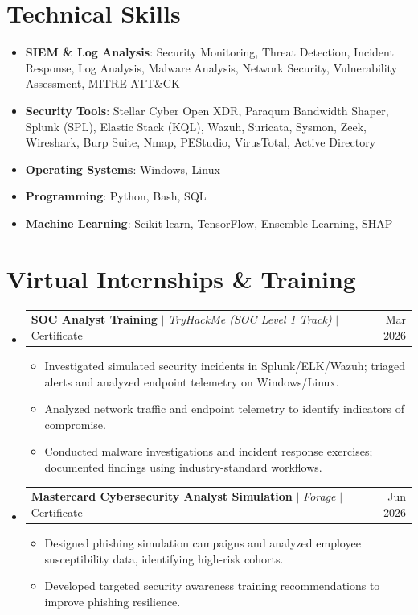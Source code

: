 \documentclass[letterpaper,11pt]{article}
\makeatletter
\newcommand{\resumeItem}[1]{
  \item\small{#1}
}
\newcommand{\resumeProjectHeading}[2]{
    \item
    \begin{tabular*}{0.97\textwidth}{l@{\extracolsep{\fill}}r}
      \small#1 & #2 \\
    \end{tabular*}\vspace{-7pt}
}
\newcommand{\resumeSubHeadingListStart}{\begin{itemize}[leftmargin=0.15in, label={}]}
\newcommand{\resumeSubHeadingListEnd}{\end{itemize}}
\newcommand{\resumeItemListStart}{\begin{itemize}}
\newcommand{\resumeItemListEnd}{\end{itemize}\vspace{-5pt}}
\makeatother
\begin{document}
\section{Technical Skills}
\begin{itemize}[leftmargin=0.15in, label={}]
\small
\item{\textbf{SIEM \& Log Analysis}: Security Monitoring, Threat Detection, Incident Response, Log Analysis, Malware Analysis, Network Security, Vulnerability Assessment, MITRE ATT\&CK}
\item{\textbf{Security Tools}: Stellar Cyber Open XDR, Paraqum Bandwidth Shaper, Splunk (SPL), Elastic Stack (KQL), Wazuh, Suricata, Sysmon, Zeek, Wireshark, Burp Suite, Nmap, PEStudio, VirusTotal, Active Directory}
\item{\textbf{Operating Systems}: Windows, Linux}
\item{\textbf{Programming}: Python, Bash, SQL}
\item{\textbf{Machine Learning}: Scikit-learn, TensorFlow, Ensemble Learning, SHAP}
\end{itemize}
%

\section{Virtual Internships \& Training}
    \resumeSubHeadingListStart%
\resumeProjectHeading%
          {\textbf{SOC Analyst Training} $|$ \emph{TryHackMe (SOC Level 1 Track)} $|$ \href{https://tryhackme-certificates.s3-eu-west-1.amazonaws.com/THM-NXIMKAYVCK.pdf}{\small Certificate}}{Mar 2026}
          \resumeItemListStart%
            \resumeItem{Investigated simulated security incidents in Splunk/ELK/Wazuh; triaged alerts and analyzed endpoint telemetry on Windows/Linux.}
            \resumeItem{Analyzed network traffic and endpoint telemetry to identify indicators of compromise.}
            \resumeItem{Conducted malware investigations and incident response exercises; documented findings using industry-standard workflows.}
          \resumeItemListEnd%
\resumeProjectHeading%
          {\textbf{Mastercard Cybersecurity Analyst Simulation} $|$ \emph{Forage} $|$ \href{https://www.theforage.com/completion-certificates/mfxGwGDp6WkQmtmTf/vcKAB5yYAgvemepGQ_mfxGwGDp6WkQmtmTf_698815166064ac3f24d2de3f_1774470032424_completion_certificate.pdf}{\small Certificate}}{Jun 2026}
          \resumeItemListStart%
            \resumeItem{Designed phishing simulation campaigns and analyzed employee susceptibility data, identifying high-risk cohorts.}
            \resumeItem{Developed targeted security awareness training recommendations to improve phishing resilience.}
          \resumeItemListEnd%
    \resumeSubHeadingListEnd%
%
\end{document}
